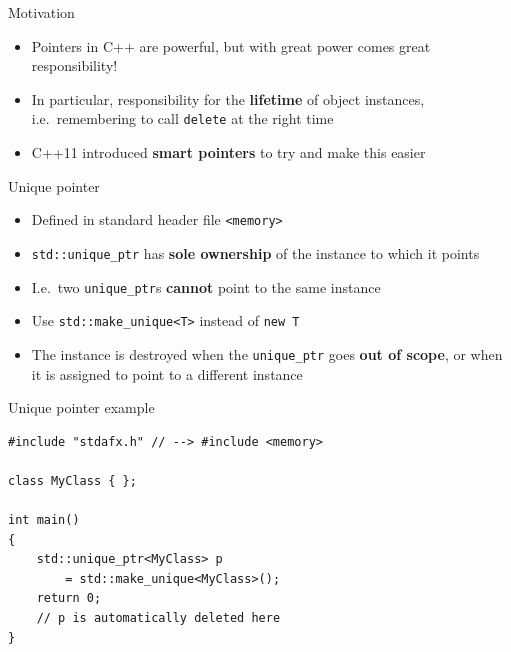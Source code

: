 
\begin{frame}{Motivation}
    \begin{itemize}
        \item Pointers in C++ are powerful, but with great power comes great responsibility! \pause
        \item In particular, responsibility for the \textbf{lifetime} of object instances,
            i.e.\ remembering to call \lstinline{delete} at the right time \pause
        \item C++11 introduced \textbf{smart pointers} to try and make this easier
    \end{itemize}
\end{frame}

\begin{frame}{Unique pointer}
    \begin{itemize}
        \item Defined in standard header file \lstinline{<memory>} \pause
        \item \lstinline{std::unique_ptr} has \textbf{sole ownership} of the instance to which it points \pause
        \item I.e.\ two \lstinline{unique_ptr}s \textbf{cannot} point to the same instance \pause
        \item Use \lstinline{std::make_unique<T>} instead of \lstinline{new T} \pause
        \item The instance is destroyed when the \lstinline{unique_ptr} goes \textbf{out of scope},
            or when it is assigned to point to a different instance
    \end{itemize}
\end{frame}

\begin{frame}[fragile]{Unique pointer example}
    \begin{lstlisting}
#include "stdafx.h" // --> #include <memory>

class MyClass { };

int main()
{
    std::unique_ptr<MyClass> p
        = std::make_unique<MyClass>();
    return 0;
    // p is automatically deleted here
}
    \end{lstlisting}
\end{frame}

